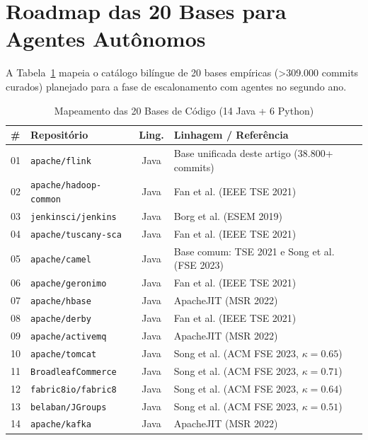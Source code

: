\documentclass[10pt,journal,compsoc]{IEEEtran}
\begin{document}
\section{Roadmap das 20 Bases para Agentes Autônomos}
A Tabela~\ref{tab:bases20} mapeia o catálogo bilíngue de 20 bases empíricas (>309.000 commits curados) planejado para a fase de escalonamento com agentes no segundo ano.

\begin{table}[h]
\centering
\caption{Mapeamento das 20 Bases de Código (14 Java + 6 Python)}
\label{tab:bases20}
\begin{tabularx}{\columnwidth}{llcX}
\toprule
\textbf{\#} & \textbf{Repositório} & \textbf{Ling.} & \textbf{Linhagem / Referência} \\
\midrule
01 & \texttt{apache/flink} & Java & Base unificada deste artigo (38.800+ commits) \\
02 & \texttt{apache/hadoop-common} & Java & Fan et al. (IEEE TSE 2021) \cite{fan2021impact} \\
03 & \texttt{jenkinsci/jenkins} & Java & Borg et al. (ESEM 2019) \cite{borg2019szz} \\
04 & \texttt{apache/tuscany-sca} & Java & Fan et al. (IEEE TSE 2021) \cite{fan2021impact} \\
05 & \texttt{apache/camel} & Java & Base comum: TSE 2021 e Song et al. (FSE 2023) \\
06 & \texttt{apache/geronimo} & Java & Fan et al. (IEEE TSE 2021) \cite{fan2021impact} \\
07 & \texttt{apache/hbase} & Java & ApacheJIT (MSR 2022) \cite{keshavarz2022apachejit} \\
08 & \texttt{apache/derby} & Java & Fan et al. (IEEE TSE 2021) \cite{fan2021impact} \\
09 & \texttt{apache/activemq} & Java & ApacheJIT (MSR 2022) \cite{keshavarz2022apachejit} \\
10 & \texttt{apache/tomcat} & Java & Song et al. (ACM FSE 2023, $\kappa=0.65$) \cite{song2023practical} \\
11 & \texttt{BroadleafCommerce} & Java & Song et al. (ACM FSE 2023, $\kappa=0.71$) \cite{song2023practical} \\
12 & \texttt{fabric8io/fabric8} & Java & Song et al. (ACM FSE 2023, $\kappa=0.64$) \cite{song2023practical} \\
13 & \texttt{belaban/JGroups} & Java & Song et al. (ACM FSE 2023, $\kappa=0.51$) \cite{song2023practical} \\
14 & \texttt{apache/kafka} & Java & ApacheJIT (MSR 2022) \cite{keshavarz2022apachejit} \\

\end{tabularx}
\end{table}
\end{document}
